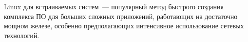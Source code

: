 Linux для встраиваемых систем\ ---
популярный метод быстрого создания комплекса ПО для больших сложных приложений,
работающих на достаточно мощном железе, особенно предполагающих интенсивное
использование сетевых технологий.

